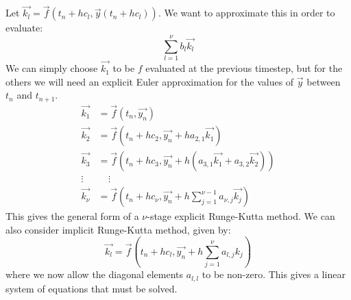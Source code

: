 \documentclass[../Main.tex]{subfiles}
\begin{document}
Let $\vec{k_l} = \vec{f}(t_n + h c_l, \vec{y}(t_n + h c_l))$. We want to approximate this in order to evaluate:
\begin{equation*}
    \sum_{l=1}^{\nu} b_l \vec{k_l}
\end{equation*}
We can simply choose $\vec{k_1}$ to be $f$ evaluated at the previous timestep, but for the others we will need an explicit Euler approximation for the values of $\vec{y}$ between $t_n$ and $t_{n+1}$.
\begin{align*}
    \vec{k_1} &= \vec{f}(t_n, \vec{y_n}) \\
    \vec{k_2} &= \vec{f}(t_n + h c_2, \vec{y_n} + h a_{2, 1} \vec{k_1}) \\
    \vec{k_3} &= \vec{f}(t_n + h c_3, \vec{y_n} + h(a_{3,1} \vec{k_1} + a_{3,2} \vec{k_2})) \\
    \vdots~~&~~~~~\vdots \\
    \vec{k_\nu} &= \vec{f}(t_n + h c_\nu, \vec{y_n} + h \sum_{j=1}^{\nu - 1} a_{\nu,j} \vec{k_j})
\end{align*}
This gives the general form of a $\nu$-stage explicit Runge-Kutta method. We can also consider implicit Runge-Kutta method, given by:
\begin{equation*}
    \vec{k_l} = \vec{f}(t_n + h c_l, \vec{y_n} + h \sum_{j=1}^{\nu} a_{l, j} k_j)
\end{equation*}
where we now allow the diagonal elements $a_{l, l}$ to be non-zero. This gives a linear system of equations that must be solved.
\end{document}
